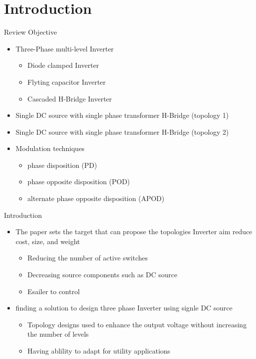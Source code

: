 \documentclass[
	11pt, %
]{beamer}
\begin{document}

\section{Introduction}
\begin{frame}{Review Objective}
	\begin{itemize}
		\scriptsize
		\setlength{\itemsep}{10pt}
		\item {Three-Phase multi-level Inverter}
		\begin{itemize}
			\scriptsize
			\item{Diode clamped Inverter}
			\item{Flyting capacitor Inverter}
			\item{Cascaded H-Bridge Inverter}
		\end{itemize}
		\item{Single DC source with single phase transformer H-Bridge (topology 1)}
		\item{Single DC source with single phase transformer H-Bridge (topology 2)}
		\item{Modulation techniques}
		\begin{itemize}
			\scriptsize
			\item {phase disposition (PD)}
			\item {phase opposite disposition (POD)}
			\item {alternate phase opposite disposition (APOD)}
		\end{itemize}
	\end{itemize}
\end{frame}

\begin{frame}{Introduction}
	\begin{itemize}
		\scriptsize
		\setlength{\itemsep}{10pt}
		\item {The paper sets the target that can propose the topologies Inverter aim reduce cost, size, and weight}
			\begin{itemize}
				\scriptsize
				\item {Reducing the number of active switches}
				\item {Decreasing source components such as DC source}
				\item {Esailer to control}
			\end{itemize}
		\item{finding a solution to design three phase Inverter using signle DC source}
		\begin{itemize}
			\scriptsize
			\item {Topology designs used to enhance the output voltage without increasing the number of levels}
			\item {Having ablility to adapt for utility applications}
		\end{itemize}
	\end{itemize}
\end{frame}
\end{document}
